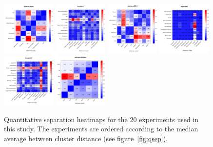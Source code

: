 \documentclass[12pt]{article}\usepackage[]{graphicx}\usepackage[]{color}
\begin{document}
\begin{figure}[p]
  \includegraphics[width = 0.24\textwidth]{./figure/allhmaps-15.pdf}
  \includegraphics[width = 0.24\textwidth]{./figure/allhmaps-16.pdf}
  \includegraphics[width = 0.24\textwidth]{./figure/allhmaps-17.pdf}
  \includegraphics[width = 0.24\textwidth]{./figure/allhmaps-18.pdf}
  \includegraphics[width = 0.24\textwidth]{./figure/allhmaps-19.pdf}
  \includegraphics[width = 0.24\textwidth]{./figure/allhmaps-20.pdf}
  \caption{Quantitative separation heatmaps for the 20
    experiments used in this study. The experiments are ordered
    according to the median average between cluster distance (see
    figure~\ref{fig:qsep}). }
  \label{fig:allhmaps}
\end{figure}
\end{document}
